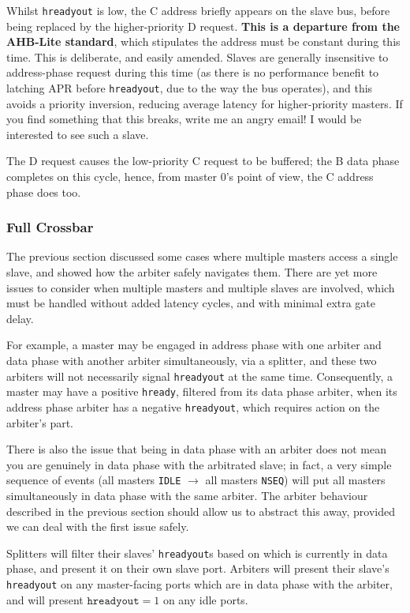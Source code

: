 \documentclass[notitlepage]{article}
\begin{document}
Whilst \texttt{hreadyout} is low, the C address briefly appears on the slave bus, before being replaced by the higher-priority D request. \textbf{This is a departure from the AHB-Lite standard}, which stipulates the address must be constant during this time. This is deliberate, and easily amended. Slaves are generally insensitive to address-phase request during this time (as there is no performance benefit to latching APR before \texttt{hreadyout}, due to the way the bus operates), and this avoids a priority inversion, reducing average latency for higher-priority masters. If you find something that this breaks, write me an angry email! I would be interested to see such a slave.

The D request causes the low-priority C request to be buffered; the B data phase completes on this cycle, hence, from master 0's point of view, the C address phase does too.

\subsubsection{Full Crossbar}

The previous section discussed some cases where multiple masters access a single slave, and showed how the arbiter safely navigates them. There are yet more issues to consider when multiple masters and multiple slaves are involved, which must be handled without added latency cycles, and with minimal extra gate delay.

For example, a master may be engaged in address phase with one arbiter and data phase with another arbiter simultaneously, via a splitter, and these two arbiters will not necessarily signal \texttt{hreadyout} at the same time. Consequently, a master may have a positive \texttt{hready}, filtered from its data phase arbiter, when its address phase arbiter has a negative \texttt{hreadyout}, which requires action on the arbiter's part.

There is also the issue that being in data phase with an arbiter does not mean you are genuinely in data phase with the arbitrated slave; in fact, a very simple sequence of events (all masters \texttt{IDLE} $\to$ all masters \texttt{NSEQ}) will put all masters simultaneously in data phase with the same arbiter. The arbiter behaviour described in the previous section should allow us to abstract this away, provided we can deal with the first issue safely.

Splitters will filter their slaves' \texttt{hreadyout}s based on which is currently in data phase, and present it on their own slave port. Arbiters will present their slave's \texttt{hreadyout} on any master-facing ports which are in data phase with the arbiter, and will present $\texttt{hreadyout} = 1$ on any idle ports.
\end{document}
